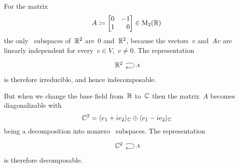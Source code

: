 \subsection{}

For the matrix
\[
  A
  \defined
  \begin{bmatrix*}[r]
    0 & -1  \\
    1 &  0
  \end{bmatrix*}
  \in
  \mat{2}{\Real}
\]
the only~ subspaces of~$\mathbb{R}^2$ are~$0$ and~$\mathbb{R}^2$, because the vectors~$v$ and~$Av$ are linearly independent for every~$v \in V$,~$v \neq 0$.
The representation
\[
  \begin{tikzcd}
    \Real^2
    \arrow[loop right]{}[right]{A}
  \end{tikzcd}
\]
is therefore irreducible, and hence indecomposable.

But when we change the base field from~$\mathbb{R}$ to~$\mathbb{C}$ then the matrix~$A$ becomes diagonalizable with
\[
    \mathbb{C}^2
  = \langle e_1 + i e_2 \rangle_{\mathbb{C}}
    \oplus
    \langle e_1 - i e_2 \rangle_{\mathbb{C}}
\]
being a decomposition into nonzero~ subspaces.
The representation
\[
  \begin{tikzcd}
    \Complex^2
    \arrow[loop right]{}[right]{A}
  \end{tikzcd}
\]
is therefore decomposable.


